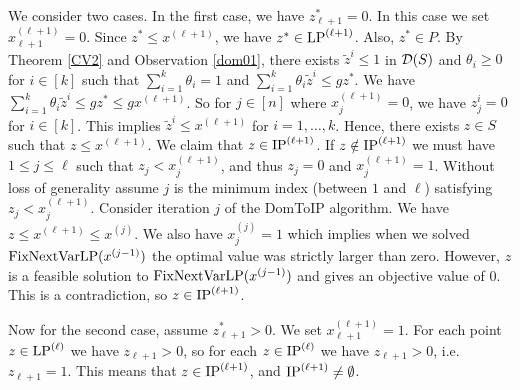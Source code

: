 We consider two cases. In the first case, we have $z^*_{\ell+1}=0$. In this case we set $x^{(\ell+1)}_{\ell+1}=0$. Since $z^*\leq x^{(\ell+1)}$, we have $z^*\in \operatorname{LP}^{(\ell+1)}$. Also, $z^*\in P$. By Theorem \ref{CV2} and Observation \ref{dom01}, there exists $\tilde{z}^i\leq 1$ in $\operatorname{\mathcal{D}}(S)$ and $\theta_i\geq 0$ for $i\in [k]$ such that $\sum_{i=1}^{k} \theta_i = 1$ and  $\sum_{i=1}^{k}\theta_i \tilde{z}^i \leq gz^*$. We have $\sum_{i=1}^{k}\theta_i \tilde{z}^i \leq gz^*\leq gx^{(\ell+1)}$.
So for $j\in [n]$ where $x^{(\ell+1)}_j=0$, we have $z^i_j=0$ for $i\in [k]$. This implies $\tilde{z}^i\leq x^{(\ell+1)}$ for $i=1,\ldots,k$. Hence, there exists $z\in S$ such that $z\leq x^{(\ell+1)}$. We claim that $z\in \operatorname{IP}^{(\ell+1)}$. If $z\notin \operatorname{IP}^{(\ell+1)}$ we must have $1\leq j \leq \ell$ such that $z_j < x^{(\ell+1)}_{j}$, and thus $z_j = 0$ and $x^{(\ell+1)}_j=1$. Without loss of generality assume $j$ is the minimum index (between $1$ and $\ell$) satisfying $z_j < x^{(\ell+1)}_{j}$. Consider iteration $j$ of the DomToIP algorithm. We have $z\leq x^{(\ell+1)}\leq x^{(j)}$.
We also have $x^{(j)}_j=1$ which implies when we solved $\operatorname{{{FixNextVarLP}}}(x^{(j-1)})$ the optimal value was strictly larger than zero. However, $z$ is a feasible solution to $\operatorname{{{FixNextVarLP}}}(x^{(j-1)})$ and gives an objective value of 0. This is a contradiction, so $z\in \operatorname{IP}^{(\ell+1)}$.

Now for the second case, assume $z^*_{\ell+1} > 0$. We set $x^{(\ell+1)}_{\ell+1}=1$. For each point $z\in \operatorname{LP}^{(\ell)}$ we have $z_{\ell+1} >0$, so for each $z\in \operatorname{IP}^{(\ell)}$ we have $z_{\ell+1}>0$, i.e. $z_{\ell+1}=1$. This means that $z\in \operatorname{IP}^{(\ell+1)}$, and $\operatorname{IP}^{(\ell+1)} \neq \emptyset$.

